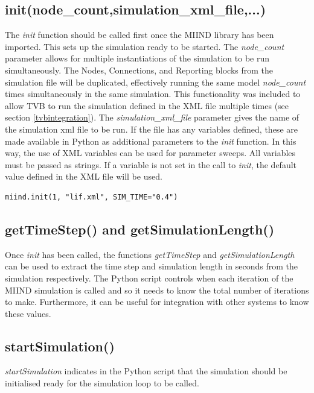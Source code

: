 \documentclass[utf8]{frontiersSCNS} %
\begin{document}
\subsection{init(node\_count,simulation\_xml\_file,...)}
The \textit{init} function should be called first once the MIIND library has been imported. This sets up the simulation ready to be started. The \textit{node\_count} parameter allows for multiple instantiations of the simulation to be run simultaneously. The Nodes, Connections, and Reporting blocks from the simulation file will be duplicated, effectively running the same model \textit{node\_count} times simultaneously in the same simulation. This functionality was included to allow TVB to run the simulation defined in the XML file multiple times (see section \ref{tvbintegration}). The \textit{simulation\_xml\_file} parameter gives the name of the simulation xml file to be run. If the file has any variables defined, these are made available in Python as additional parameters to the \textit{init} function. In this way, the use of XML variables can be used for parameter sweeps. All variables must be passed as strings. If a variable is not set in the call to \textit{init}, the default value defined in the XML file will be used.

\begin{lstlisting}[caption={Calling init for a MIIND simulation lif.xml with the Variable SIM\_TIME set to 0.4.}]
miind.init(1, "lif.xml", SIM_TIME="0.4")
\end{lstlisting}

\subsection{getTimeStep() and getSimulationLength()}
Once \textit{init} has been called, the functions \textit{getTimeStep} and \textit{getSimulationLength} can be used to extract the time step and simulation length in seconds from the simulation respectively. The Python script controls when each iteration of the MIIND simulation is called and so it needs to know the total number of iterations to make. Furthermore, it can be useful for integration with other systems to know these values.

\subsection{startSimulation()}
\textit{startSimulation} indicates in the Python script that the simulation should be initialised ready for the simulation loop to be called.
\end{document}
